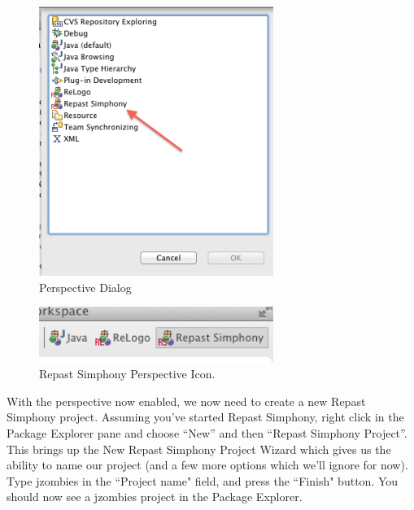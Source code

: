 \documentclass[11pt]{amsart}
\begin{document}
\begin{figure}[h]
\begin{center}
\vspace{.2in}
\centerline {
\includegraphics[width=3in]{GettingStartedImages/perspective.png}
}
\caption{Perspective Dialog}
\label{fig:perspective}
\end{center}
\end{figure}

\begin{figure}[h]
\begin{center}
\vspace{.2in}
\centerline {
\includegraphics[width=3in]{GettingStartedImages/rs_perspective.png}
}
\caption{Repast Simphony Perspective Icon.}
\label{fig:rsperspective}
\end{center}
\end{figure}

With the perspective now enabled, we now need to create a new Repast Simphony project. Assuming you've started Repast Simphony, right click in the Package Explorer pane and choose ``New'' and then ``Repast Simphony Project''. This brings up the New Repast Simphony Project Wizard  which gives us the ability to name our project (and a few more options which we'll ignore for now). Type jzombies in the ``Project name" field, and press the ``Finish" button. You should now see a jzombies project in the Package Explorer.
\end{document}
